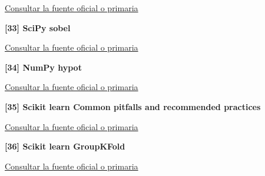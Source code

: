 \href{https://docs.scipy.org/doc/scipy/reference/generated/scipy.ndimage.median_filter.html}{Consultar la fuente oficial o primaria}\par\medskip

\hypertarget{refR33}{}\textbf{[33] SciPy sobel}\par

\href{https://docs.scipy.org/doc/scipy/reference/generated/scipy.ndimage.sobel.html}{Consultar la fuente oficial o primaria}\par\medskip

\hypertarget{refR34}{}\textbf{[34] NumPy hypot}\par

\href{https://numpy.org/doc/stable/reference/generated/numpy.hypot.html}{Consultar la fuente oficial o primaria}\par\medskip

\hypertarget{refR35}{}\textbf{[35] Scikit learn Common pitfalls and recommended practices}\par

\href{https://scikit-learn.org/stable/common_pitfalls.html#data-leakage}{Consultar la fuente oficial o primaria}\par\medskip

\hypertarget{refR36}{}\textbf{[36] Scikit learn GroupKFold}\par

\href{https://scikit-learn.org/stable/modules/generated/sklearn.model_selection.GroupKFold.html}{Consultar la fuente oficial o primaria}\par\medskip

